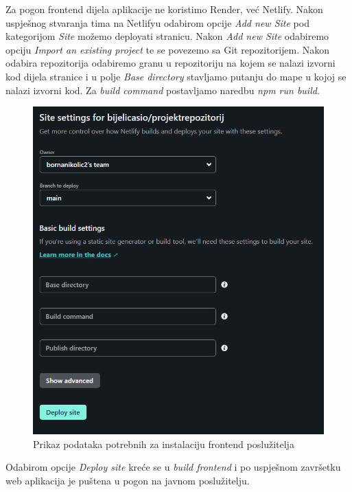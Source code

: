 			Za pogon frontend dijela aplikacije ne koristimo Render, već Netlify. Nakon uspješnog stvaranja tima na Netlifyu odabirom opcije \textit{Add new Site} pod kategorijom \textit{Site} možemo deployati stranicu. Nakon \textit{Add new Site} odabiremo opciju \textit{Import an existing project} te se povezemo sa Git repozitorijem. Nakon odabira repozitorija odabiremo granu u repozitoriju na kojem se nalazi izvorni kod dijela stranice i u polje \textit{Base directory} stavljamo putanju do mape u kojoj se nalazi izvorni kod. Za \textit{build command} postavljamo naredbu \textit{npm run build}. 
			\begin{figure}[H]
				\includegraphics[scale=0.5]{slike/slika6.png}
				\centering
				\caption{Prikaz podataka potrebnih za instalaciju frontend poslužitelja}
				\label{fig:frontend pod}
			\end{figure}
			
			Odabirom opcije \textit{Deploy site} kreće se u \textit{build frontend} i po uspješnom završetku web aplikacija je puštena u pogon na javnom poslužitelju.
			\eject 